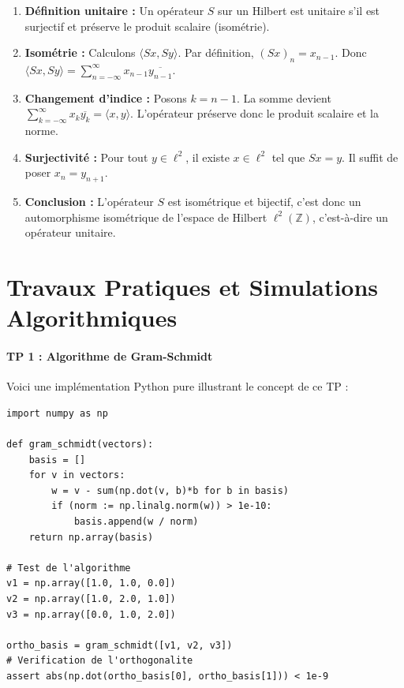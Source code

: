 \documentclass[11pt,a4paper]{article}
\begin{document}
\begin{enumerate}
\item \textbf{Définition unitaire :} Un opérateur $S$ sur un Hilbert est unitaire s'il est surjectif et préserve le produit scalaire (isométrie).
\item \textbf{Isométrie :} Calculons $\langle Sx, Sy \rangle$. Par définition, $(Sx)_n = x_{n-1}$. Donc $\langle Sx, Sy \rangle = \sum_{n=-\infty}^\infty x_{n-1} \overline{y_{n-1}}$.
\item \textbf{Changement d'indice :} Posons $k = n-1$. La somme devient $\sum_{k=-\infty}^\infty x_k \overline{y_k} = \langle x, y \rangle$. L'opérateur préserve donc le produit scalaire et la norme.
\item \textbf{Surjectivité :} Pour tout $y \in \ell^2$, il existe $x \in \ell^2$ tel que $Sx = y$. Il suffit de poser $x_n = y_{n+1}$.
\item \textbf{Conclusion :} L'opérateur $S$ est isométrique et bijectif, c'est donc un automorphisme isométrique de l'espace de Hilbert $\ell^2(\mathbb{Z})$, c'est-à-dire un opérateur unitaire.
\end{enumerate}


\newpage
\part{Travaux Pratiques et Simulations Algorithmiques}

\subsection*{TP 1 : Algorithme de Gram-Schmidt}

Voici une implémentation Python pure illustrant le concept de ce TP :


\begin{lstlisting}
import numpy as np

def gram_schmidt(vectors):
    basis = []
    for v in vectors:
        w = v - sum(np.dot(v, b)*b for b in basis)
        if (norm := np.linalg.norm(w)) > 1e-10:
            basis.append(w / norm)
    return np.array(basis)

# Test de l'algorithme
v1 = np.array([1.0, 1.0, 0.0])
v2 = np.array([1.0, 2.0, 1.0])
v3 = np.array([0.0, 1.0, 2.0])

ortho_basis = gram_schmidt([v1, v2, v3])
# Verification de l'orthogonalite
assert abs(np.dot(ortho_basis[0], ortho_basis[1])) < 1e-9
\end{lstlisting}
\end{document}
